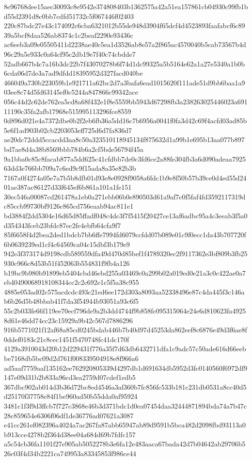 \documentclass[11pt,a4paper]{article}
\begin{document}
{8e96768dee15aec30093c8e9542e374808403b1362575a42a51ea157861cb04930c99fb1bd55d2391d8c0bb7cdfd51732c5f067446f02403
220c87bdc27e43c174092c6cba6321012b55de948d3904f65dcf4d4523893faafabcf6c8939a5bcf8daa526ab8374c1c2beaf2290e93436c
ac6eeb3a09e05505411d2238ae40c5ea1d3526ab8e57a2f865ac4570040b5cab73567b4d96c29a5e933c0a64cf95c2db19e7f40c74cbdde7
52adb667b4c7a16b3dc22b7f43070278b6f74d1dc99325a5b5164e62a1a27e5340a1b0b6cda06d7de3a7ad9dfdd18395952d327facd040be
466049a730b223059b1e921711a62bc2d7a3bafa6ead1015620f111ade51d9bb6baa1a903ee8c74d5fd63145ef0c5244a847866c99342ace
056c44d2c62de762ea5cd8a68f432e1f8e5559bb5943d67298fb3a238263025446023a69111190c35fa2afb17968e515995113296fce8559
0d896d021e4a7372dbe0b2f2eb6fb36a5dd16c7b6956a0041f0fa3d42c69f4acfd03ad85b5e6f1ad903b02cb2203053eff725d6d7fa836d7
ae20dc72ddd5ccacdd3aa8c50a323510118945134f875632d1a99b1e695b13aa077b897bd7ae8d4a38b8569bbb784b6a2cf5bde56794f45a
9a1bba0c85c8facab877a5dd625c41cfdbb7de0c3fd6ce2a88fe304fb3a6d090adeaa792563dd3e766bb709a7c6ed9c9f15ada8a35e82b3b
7167a0f4274a05e7a7b5b8dfb01d93e8e0928f9058a6fdc1b9e8f50b57b39ce0d4ed55d2401ae387ac86127d33f645ef6b861a101a1fe151
30ec546a00087cd261478a1eb0a271ebb06b0e890503d61a9af7c0f5faf4fd3592117319dc85ccb99730bf9126c865cd756eaab94ac811e1
bd3884f2dd5304e16d65d85ffadf048c4dc3f7f5415f20427ce13af6adbc95a4c3eeab3f5a0d354343fceb23bfdc87ec2fe4ebfb64cfa9f7
85f6658f4d2bea2ded1bdcb7bb6ffe7994fd6079ccfdd07b089e01c9f0ecc1da43b707720f6b0639239ed1cf4c64569ca04c15dbf3b179e9
942e3f373174d9198cdb589559dfa49d470d85bef1f4789320ec2f9117362e3bf809b3fb25930c966c8d53b51f452063b554831f9fb4a126
b19bc9b980b91899eb5404cbd46ebd255a03469c0a299b02a019ed0e21a3c0c422ae0a7eb40490068918108344cc2c2c692e1c5f5a38c955
4885e053ad02c575acdcdc493c21ed6ee172d303a8093aa52338496e87c4da445f3c146ab6b26d5b48bbab41f7da3f54944b93051a93c6f5
55c2b033fe66f119ee70ecf796de9a2b3dd4744f9b858fc095315064e24e6d810623fa49258d61e46dd74cc23c15929a9b42c567d7886296
916b5771021f12af68a85cd0245bdab446b7b40d97d45253da862eef8c6876e49d3f6ae8f0ddef0183c21c8cec1451f5470748fc41dc170f
4129a3910043d20b12d229431f776a35f7d63db6432711dfa1c9adc57c50ade616d66eebbe7168db5bc09d2d761f008339504918e8f966a6
ad5aaf7759aaf135162ee762920805339d4297db1d691634db5952d3fc0140560f6972df9147e09d31b2b833a96cd3ea2759d07cdef1edb5
367dbc902ab014d3b36d72bc8ed4546a3af360b7fc856fc533b181c231db0531a8cc40d5d25170f37758e84f1be960ad50b55dda0af95924
3481c1f3f9d3ffcb7f727c3868e46b3d371bdc1d0ea07454daa32444871894bda74a7b47c28c859654e6306f06df1de36776ad07621a3087
e41cc261ef082396a4024a7ac267fa87abb65947ab89d9591b5bca482d2098fbd93113a0b913cce4278b2f364d38ee04a684d69b7fdfc157
a5c54cb36fa1101f27e905ab5052278b3e6fa12e483aaca67bada42d7b04642ab29706b526c03f4d34b2221ca749953a83345853f986ce44
}
\end{document}
